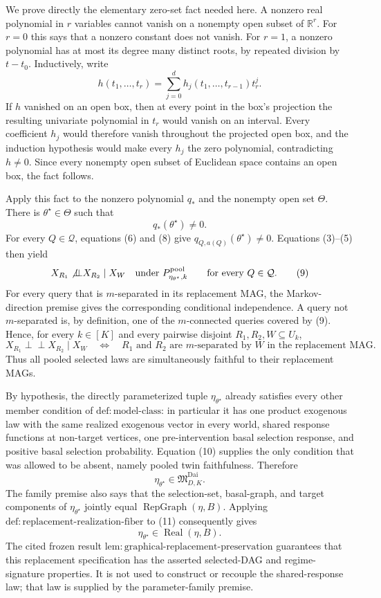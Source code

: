 We prove directly the elementary zero-set fact needed here.  A nonzero real polynomial in \(r\) variables cannot vanish on a nonempty open subset of \(\mathbb R^r\).  For \(r=0\) this says that a nonzero constant does not vanish.  For \(r=1\), a nonzero polynomial has at most its degree many distinct roots, by repeated division by \(t-t_0\).  Inductively, write
\[
 h(t_1,\ldots,t_r)=\sum_{j=0}^{d}h_j(t_1,\ldots,t_{r-1})t_r^j.
 \tag{7}
\]
If \(h\) vanished on an open box, then at every point in the box's projection the resulting univariate polynomial in \(t_r\) would vanish on an interval.  Every coefficient \(h_j\) would therefore vanish throughout the projected open box, and the induction hypothesis would make every \(h_j\) the zero polynomial, contradicting \(h\ne0\).  Since every nonempty open subset of Euclidean space contains an open box, the fact follows.

Apply this fact to the nonzero polynomial \(q_*\) and the nonempty open set \(\Theta\).  There is \(\theta^\star\in\Theta\) such that
\[
 q_*(\theta^\star)\ne0.
 \tag{8}
\]
For every \(Q\in\mathcal Q\), equations (6) and (8) give \(q_{Q,a(Q)}(\theta^\star)\ne0\).  Equations (3)--(5) then yield
\[
 X_{R_1}\not\!\mathbin{\perp\!\!\!\perp}X_{R_2}\mid X_W
 \quad\text{under }P_{\eta_{\theta^\star},k}^{\mathrm{pool}}
 \qquad\text{for every }Q\in\mathcal Q.
 \tag{9}
\]
For every query that is \(m\)-separated in its replacement MAG, the Markov-direction premise gives the corresponding conditional independence.  A query not \(m\)-separated is, by definition, one of the \(m\)-connected queries covered by (9).  Hence, for every \(k\in[K]\) and every pairwise disjoint \(R_1,R_2,W\subseteq U_k\),
\[
 X_{R_1}\mathbin{\perp\!\!\!\perp}X_{R_2}\mid X_W
 \quad\Longleftrightarrow\quad
 R_1\text{ and }R_2\text{ are }m\text{-separated by }W
 \text{ in the replacement MAG}.
 \tag{10}
\]
Thus all pooled selected laws are simultaneously faithful to their replacement MAGs.

By hypothesis, the directly parameterized tuple \(\eta_{\theta^\star}\) already satisfies every other member condition of \(\mathrm{def:model\mbox{-}class}\): in particular it has one product exogenous law with the same realized exogenous vector in every world, shared response functions at non-target vertices, one pre-intervention basal selection response, and positive basal selection probability.  Equation (10) supplies the only condition that was allowed to be absent, namely pooled twin faithfulness.  Therefore
\[
 \eta_{\theta^\star}\in\mathfrak M_{D,K}^{\mathrm{Dai}}.
 \tag{11}
\]
The family premise also says that the selection-set, basal-graph, and target components of \(\eta_{\theta^\star}\) jointly equal \(\operatorname{RepGraph}(\eta,B)\).  Applying \(\mathrm{def:replacement\mbox{-}realization\mbox{-}fiber}\) to (11) consequently gives
\[
 \eta_{\theta^\star}\in\operatorname{Real}(\eta,B).
 \tag{12}
\]
The cited frozen result \(\mathrm{lem:graphical\mbox{-}replacement\mbox{-}preservation}\) guarantees that this replacement specification has the asserted selected-DAG and regime-signature properties.  It is not used to construct or recouple the shared-response law; that law is supplied by the parameter-family premise.


